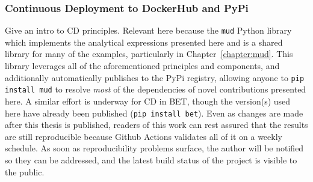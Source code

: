 \subsubsection{Continuous Deployment to DockerHub and PyPi}
Give an intro to CD principles. Relevant here because the {\tt mud} Python library which implements the analytical expressions presented here and is a shared library for many of the examples, particularly in Chapter~\ref{chapter:mud}.
This library leverages all of the aforementioned principles and components, and additionally automatically publishes to the PyPi registry, allowing anyone to {\tt pip install mud} to resolve \emph{most} of the dependencies of novel contributions presented here.
A similar effort is underway for CD in BET, though the version(s) used here have already been published ({\tt pip install bet}).
Even as changes are made after this thesis is published, readers of this work can rest assured that the results are still reproducible because Github Actions validates all of it on a weekly schedule.
As soon as reproducibility problems surface, the author will be notified so they can be addressed, and the latest build status of the project is visible to the public.
